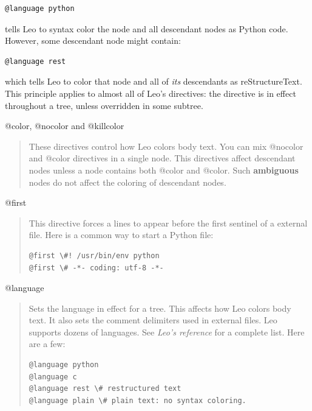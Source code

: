 \documentclass[a4paper,10pt,english]{sphinxmanual}
\begin{document}
\begin{Verbatim}[commandchars=\\\{\}]
@language python
\end{Verbatim}

tells Leo to syntax color the node and all descendant nodes as Python code.
However, some descendant node might contain:

\begin{Verbatim}[commandchars=\\\{\}]
@language rest
\end{Verbatim}

which tells Leo to color that node and all of \emph{its} descendants as
reStructureText. This principle applies to almost all of Leo's directives: the
directive is in effect throughout a tree, unless overridden in some subtree.

\begin{description}
\end{description}

@color, @nocolor and @killcolor
\begin{quote}

These directives control how Leo colors body text. You can mix @nocolor and
@color directives in a single node. This directives affect descendant
nodes unless a node contains both @color and @color.  Such \textbf{ambiguous}
nodes do not affect the coloring of descendant nodes.
\end{quote}

@first
\begin{quote}

This directive forces a lines to appear before the first sentinel of a
external file. Here is a common way to start a Python file:

\begin{Verbatim}[commandchars=\\\{\}]
@first \#! /usr/bin/env python
@first \# -*- coding: utf-8 -*-
\end{Verbatim}
\end{quote}

@language
\begin{quote}

Sets the language in effect for a tree. This affects how Leo colors body
text. It also sets the comment delimiters used in external files. Leo
supports dozens of languages. See \emph{Leo's reference} for a complete list.
Here are a few:

\begin{Verbatim}[commandchars=\\\{\}]
@language python
@language c
@language rest \# restructured text
@language plain \# plain text: no syntax coloring.
\end{Verbatim}
\end{quote}
\end{document}
